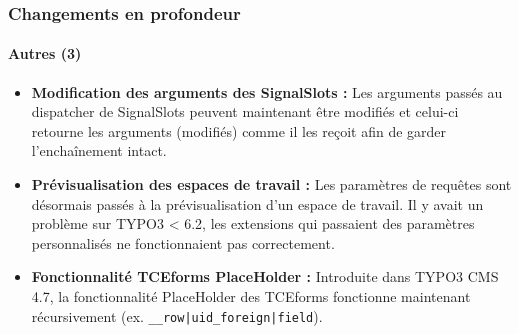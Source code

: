 \begin{frame}[fragile]
	\frametitle{Changements en profondeur}
	\framesubtitle{Autres (3)}

	\begin{itemize}

		\item \textbf{Modification des arguments des SignalSlots :}\newline
			\small
				Les arguments passés au dispatcher de \textsf{SignalSlots} peuvent maintenant être modifiés et celui-ci retourne les arguments (modifiés) comme il les reçoit afin de garder l'enchaînement intact.
			\normalsize

		\item \textbf{Prévisualisation des espaces de travail :}\newline
			\small
				Les paramètres de requêtes sont désormais passés à la prévisualisation d'un espace de travail. Il y avait un problème sur TYPO3 < 6.2, les extensions qui passaient des paramètres personnalisés ne fonctionnaient pas correctement.
			\normalsize

		\item \textbf{Fonctionnalité TCEforms PlaceHolder :}\newline
			\small
				Introduite dans TYPO3 CMS 4.7, la fonctionnalité PlaceHolder des TCEforms fonctionne maintenant récursivement (ex. \texttt{\_\_row|uid\_foreign|field}).
			\normalsize

	\end{itemize}
	
\end{frame}


